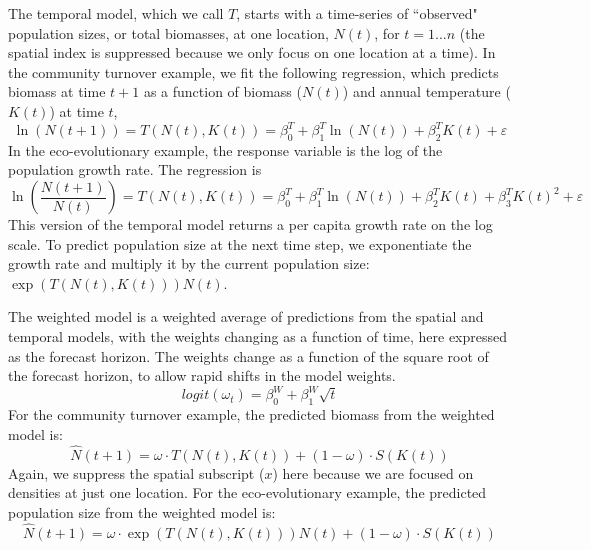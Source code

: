 \documentclass[11pt]{article}
\begin{document}
The temporal model, which we call $T$, starts with a time-series of ``observed" population sizes, or total biomasses, at one location, $N(t)$, for $t=1...n$ (the spatial index is suppressed because we only focus on one location at a time). In the community turnover example, we fit the following regression, which predicts biomass at time $t+1$ as a function of biomass ($N(t)$) and annual temperature ($K(t)$) at time $t$,
\begin{equation}
\ln(N(t+1)) = T(N(t),K(t)) = \beta^T_0 +  \beta^T_1 \ln(N(t)) +\beta^T_2 K(t)  +  \varepsilon
\label{eqn:temporal_regression_community1}
\end{equation}
In the eco-evolutionary example, the response variable is the log of the population growth rate. The regression is 
\begin{equation}
\ln\left(\frac{N(t+1)}{N(t)}\right) = T(N(t),K(t)) = \beta^T_0 +  \beta^T_1 \ln(N(t)) +\beta^T_2 K(t)  +\beta^T_3 K(t)^2 +  \varepsilon
\label{eqn:temporal_regression_ecoevo2}
\end{equation}
This version of the temporal model returns a per capita growth rate on the log scale. To predict population size at the next time step, we exponentiate the growth rate and multiply it by the current population size: $\exp(T(N(t),K(t))) N(t)$.

The weighted model is a weighted average of predictions from the spatial and temporal models, with the weights changing as a function of time, here expressed as the forecast horizon. The weights change as a function of the square root of the forecast horizon, to allow rapid shifts in the model weights. 
\begin{equation}
logit(\omega_t)=\beta^W_0 + \beta^W_1 \sqrt{t}
\label{eqn:weights}
\end{equation}
For the community turnover example, the predicted biomass from the weighted model is:
\begin{equation}
\hat{N}(t+1)= \omega \cdot T(N(t),K(t)) + (1-\omega) \cdot S(K(t)) 
\label{eqn:combined_model1}
\end{equation}
Again, we suppress the spatial subscript ($x$) here because we are focused on densities at just one location. For the eco-evolutionary example, the predicted population size from the weighted model is:
\begin{equation}
\hat{N}(t+1) = \omega \cdot \exp(T(N(t),K(t))) N(t) + (1-\omega) \cdot S(K(t)) 
\label{eqn:combined_model2}
\end{equation}
\end{document}
